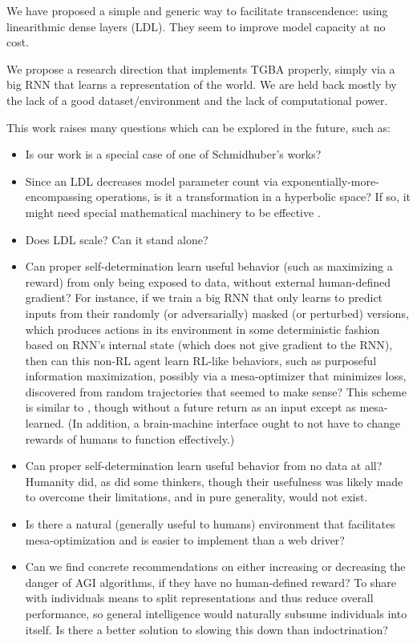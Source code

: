 \documentclass{article}
\begin{document}
We have proposed a simple and generic way to facilitate transcendence: using linearithmic dense layers (LDL). They seem to improve model capacity at no cost.

We propose a research direction that implements TGBA properly, simply via a big RNN that learns a representation of the world. We are held back mostly by the lack of a good dataset/environment and the lack of computational power.

This work raises many questions which can be explored in the future, such as:

\begin{itemize}
\item Is our work is a special case of one of Schmidhuber's works?

\item Since an LDL decreases model parameter count via exponentially-more-encompassing operations, is it a transformation in a hyperbolic space? If so, it might need special mathematical machinery to be effective \cite{peng2021hyperbolic}.

\item Does LDL scale? Can it stand alone?

\item Can proper self-determination learn useful behavior (such as maximizing a reward) from only being exposed to data, without external human-defined gradient? For instance, if we train a big RNN that only learns to predict inputs from their randomly (or adversarially) masked (or perturbed) versions, which produces actions in its environment in some deterministic fashion based on RNN's internal state (which does not give gradient to the RNN), then can this non-RL agent learn RL-like behaviors, such as purposeful information maximization, possibly via a mesa-optimizer that minimizes loss, discovered from random trajectories that seemed to make sense? This scheme is similar to \cite{schmidhuber2020reinforcement}, though without a future return as an input except as mesa-learned. (In addition, a brain-machine interface ought to not have to change rewards of humans to function effectively.)

\item Can proper self-determination learn useful behavior from no data at all? Humanity did, as did some thinkers, though their usefulness was likely made to overcome their limitations, and in pure generality, would not exist.

\item Is there a natural (generally useful to humans) environment that facilitates mesa-optimization and is easier to implement than a web driver?

\item Can we find concrete recommendations on either increasing or decreasing the danger of AGI algorithms, if they have no human-defined reward? To share with individuals means to split representations and thus reduce overall performance, so general intelligence would naturally subsume individuals into itself. Is there a better solution to slowing this down than indoctrination?
\end{itemize}
\end{document}
